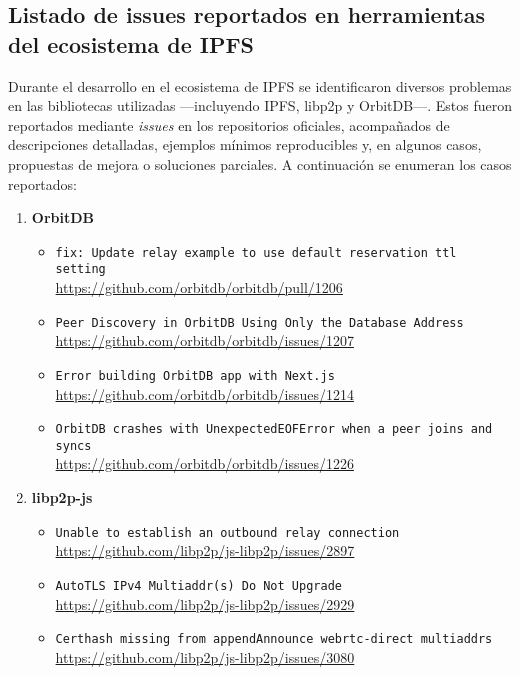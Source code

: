 \subsection{Listado de issues reportados en herramientas del ecosistema de IPFS}
\label{anexo:issues}

Durante el desarrollo en el ecosistema de IPFS se identificaron diversos problemas en las bibliotecas utilizadas —incluyendo IPFS, libp2p y OrbitDB—. Estos fueron reportados mediante \textit{issues} en los repositorios oficiales, acompañados de descripciones detalladas, ejemplos mínimos reproducibles y, en algunos casos, propuestas de mejora o soluciones parciales. A continuación se enumeran los casos reportados:

\begin{enumerate}
    \item \textbf{OrbitDB}
    \begin{itemize}
        \item \texttt{fix: Update relay example to use default reservation ttl setting}\\
        \url{https://github.com/orbitdb/orbitdb/pull/1206}
        \item \texttt{Peer Discovery in OrbitDB Using Only the Database Address}\\
        \url{https://github.com/orbitdb/orbitdb/issues/1207}
        \item \texttt{Error building OrbitDB app with Next.js}\\
        \url{https://github.com/orbitdb/orbitdb/issues/1214}
        \item \texttt{OrbitDB crashes with UnexpectedEOFError when a peer joins and syncs}\\
        \url{https://github.com/orbitdb/orbitdb/issues/1226}
    \end{itemize}

    \item \textbf{libp2p-js}
    \begin{itemize}
        \item \texttt{Unable to establish an outbound relay connection}\\
        \url{https://github.com/libp2p/js-libp2p/issues/2897}
        \item \texttt{AutoTLS IPv4 Multiaddr(s) Do Not Upgrade}\\
        \url{https://github.com/libp2p/js-libp2p/issues/2929}
        \item \texttt{Certhash missing from appendAnnounce webrtc-direct multiaddrs}\\
        \url{https://github.com/libp2p/js-libp2p/issues/3080}
    \end{itemize}
\end{enumerate}
